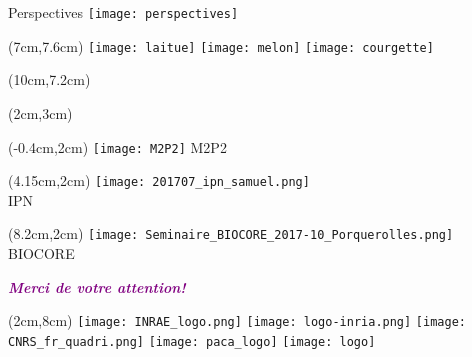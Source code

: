 %
\begin{frame}{Perspectives}
\texttt{[image: perspectives]}
 \begin{textblock*}{5cm}(7cm,7.6cm) %
\texttt{[image: laitue]} \quad
\texttt{[image: melon]} \quad
\texttt{[image: courgette]} 
\end{textblock*}
\begin{textblock*}{5cm}(10cm,7.2cm) %
 \quad
\end{textblock*}
 \begin{textblock*}{5cm}(2cm,3cm) %
 \quad
\end{textblock*}
\end{frame}



\begin{frame}[t]{}


\begin{textblock*}{5cm}(-0.4cm,2cm) %
\texttt{[image: M2P2]} \quad
\centering M2P2
\end{textblock*}




\begin{textblock*}{5cm}(4.15cm,2cm) %
\texttt{[image: 201707\_ipn\_samuel.png]} \\
\centering IPN
\end{textblock*}


\begin{textblock*}{5cm}(8.2cm,2cm) %
\texttt{[image: Seminaire\_BIOCORE\_2017-10\_Porquerolles.png]} \quad
\centering BIOCORE
\end{textblock*}

\vspace{40mm}
	\begin{center}
	\textcolor{purple}{\Large\textbf{\textit{Merci de votre attention!}}}\\

	\end{center}
  
\begin{textblock*}{15cm}(2cm,8cm) %
\texttt{[image: INRAE\_logo.png]} \quad
\texttt{[image: logo-inria.png]} \quad
\texttt{[image: CNRS\_fr\_quadri.png]} \quad
\texttt{[image: paca\_logo]} \quad
\texttt{[image: logo]} 
\end{textblock*}

\end{frame}

